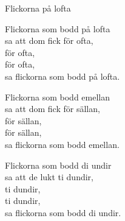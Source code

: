 \begin{song}{Flickorna på lofta}
	
	Flickorna som bodd på lofta\\
	sa att dom fick för ofta,\\
	för ofta,\\
	för ofta,\\
	sa flickorna som bodd på lofta.
	
	Flickorna som bodd emellan\\
	sa att dom fick för sällan,\\
	för sällan,\\
	för sällan,\\
	sa flickorna som bodd emellan.
	
	Flickorna som bodd di undir\\
	sa att de lukt ti dundir,\\
	ti dundir,\\
	ti dundir,\\
	sa flickorna som bodd di undir.
	
\end{song}
